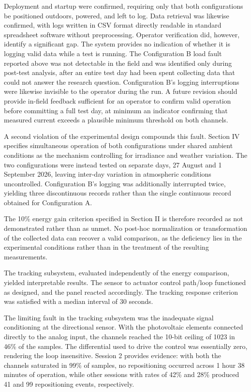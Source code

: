 \documentclass[journal]{IEEEtran}
\begin{document}
Deployment and startup were confirmed, requiring only that both configurations be
positioned outdoors, powered, and left to log. Data retrieval was likewise confirmed,
with logs written in CSV format directly readable in standard spreadsheet software
without preprocessing. Operator verification did, however, identify a significant gap.
The system provides no indication of whether it is logging valid data while a test is
running. The Configuration B load fault reported above was not detectable in the
field and was identified only during post-test analysis, after an entire test day had
been spent collecting data that could not answer the research question. Configuration
B's logging interruptions were likewise invisible to the operator during the run. A
future revision should provide in-field feedback sufficient for an operator to confirm
valid operation before committing a full test day, at minimum an indicator confirming
that measured current exceeds a plausible minimum threshold on both channels.

A second violation of the experimental design compounds this fault. Section IV
specifies simultaneous operation of both configurations under shared ambient
conditions as the mechanism controlling for irradiance and weather variation. The two
configurations were instead tested on separate days, 27 August and 1 September 2026,
leaving inter-day variation in atmospheric conditions uncontrolled. Configuration B's
logging was additionally interrupted twice, yielding three discontinuous records
rather than the single continuous record obtained for Configuration A.

The 10\% energy gain criterion specified in Section II is therefore recorded as not
demonstrated rather than as unmet. No post-hoc normalization or transformation of the
collected data can recover a valid comparison, as the deficiency lies in the
experimental conditions rather than in the treatment of the resulting measurements.

The tracking subsystem, evaluated independently of the energy comparison, yielded
interpretable results. The sensor to actuator control path/loop functioned as
designed, and the panel reacted accordingly. The tracking response criterion was
satisfied with a median interval of 30 seconds.

The limiting fault in the tracking subsystem was the inadequate signal conditioning at
the directional sensor. With the photovoltaic elements connected directly to the
analog input, the channels reached the 10-bit ceiling of 1023 in 46\% of the samples.
The differential used to drive the control was essentially zero, rendering the loop
insensitive. Session 2 provides evidence: with both the channels saturated in 99\% of
samples, no repositioning occurred across 1 hour 38 minutes of operation, while other
sessions with rates of 42\% and 28\% produced 41 and 99 repositioning events,
respectively.
\end{document}
